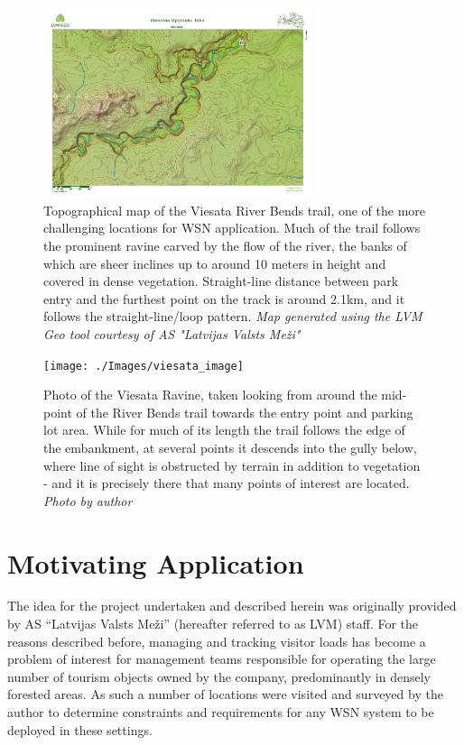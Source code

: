 \documentclass[10pt,nocopyrightspace]{ewsn-proc}
\begin{document}
\begin{figure}[t!]
\centering
\includegraphics[height=2.2in]{./Images/map1-Viesata}
	\caption{Topographical map of the Viesata River Bends trail, one of the more challenging locations for WSN application. Much of the trail follows the prominent ravine carved by the flow of the river, the banks of which are sheer inclines up to around 10 meters in height and covered in dense vegetation. Straight-line distance between park entry and the furthest point on the track is around 2.1km, and it follows the straight-line/loop pattern. \textit{Map generated using the LVM Geo tool courtesy of AS "Latvijas Valsts Meži"}}
\end{figure}

\begin{figure}[t!]
\centering
\texttt{[image: ./Images/viesata\_image]}
	\caption{Photo of the Viesata Ravine, taken looking from around the mid-point of the River Bends trail towards the entry point and parking lot area. While for much of its length the trail follows the edge of the embankment, at several points it descends into the gully below, where line of sight is obstructed by terrain in addition to vegetation - and it is precisely there that many points of interest are located. \textit{Photo by author}}
\end{figure}


\section{Motivating Application}

The idea for the project undertaken and described herein was originally provided by AS “Latvijas Valsts Meži” (hereafter referred to as LVM) staff. For the reasons described before, managing and tracking visitor loads has become a problem of interest for management teams responsible for operating the large number of tourism objects owned by the company, predominantly in densely forested areas. As such a number of locations were visited and surveyed by the author to determine constraints and requirements for any WSN system to be deployed in these settings.
\end{document}
